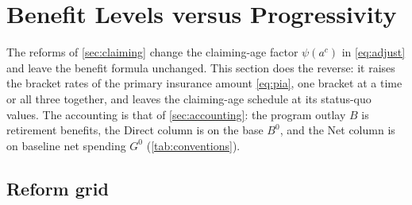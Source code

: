 \section{Benefit Levels versus Progressivity}\label{sec:progressivity}

The reforms of \autoref{sec:claiming} change the claiming-age factor $\psi(a^c)$ in \eqref{eq:adjust} and leave the benefit formula unchanged. This section does the reverse: it raises the bracket rates of the primary insurance amount \eqref{eq:pia}, one bracket at a time or all three together, and leaves the claiming-age schedule at its status-quo values. The accounting is that of \autoref{sec:accounting}: the program outlay $B$ is retirement benefits, the Direct column is on the base $B^{0}$, and the Net column is on baseline net spending $G^{0}$ (\autoref{tab:conventions}).

\subsection{Reform grid}\label{subsec:pgrid}

